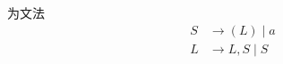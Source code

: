 \documentclass[boxes]{homework}
\begin{document}
\begin{problem}
\label{prob:4.3}
为文法
\begin{equation}
    \begin{aligned}
        S & \to (L) \mid a  \\
        L & \to L, S \mid S
    \end{aligned}
\end{equation}
\end{problem}
\end{document}
